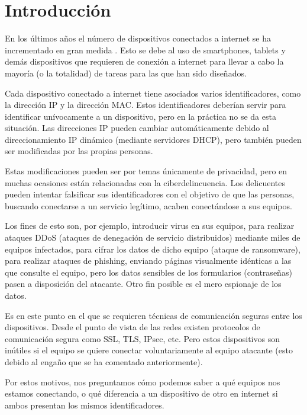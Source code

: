 
\chapter{Introducción}

En los últimos años el número de dispositivos conectados a internet se ha incrementado en gran medida \cite{84Billio53:online}. Esto se debe al uso de smartphones, tablets y demás dispositivos que requieren de conexión a internet para llevar a cabo la mayoría (o la totalidad) de tareas para las que han sido diseñados.

Cada dispositivo conectado a internet tiene asociados varios identificadores, como la dirección IP y la dirección MAC. Estos identificadores deberían servir para identificar unívocamente a un dispositivo, pero en la práctica no se da esta situación. Las direcciones IP pueden cambiar automáticamente debido al direccionamiento IP dinámico (mediante servidores DHCP), pero también pueden ser modificadas por las propias personas. 

Estas modificaciones pueden ser por temas únicamente de privacidad, pero en muchas ocasiones están relacionadas con la ciberdelincuencia. Los delicuentes pueden intentar falsificar sus identificadores con el objetivo de que las personas, buscando conectarse a un servicio legítimo, acaben conectándose a sus equipos.

Los fines de esto son, por ejemplo, introducir virus en sus equipos, para realizar ataques DDoS (ataques de denegación de servicio distribuidos) mediante miles de equipos infectados, para cifrar los datos de dicho equipo (ataque de ransomware), para realizar ataques de phishing, enviando páginas visualmente idénticas a las que consulte el equipo, pero los datos sensibles de los formularios (contraseñas) pasen a disposición del atacante. Otro fin posible es el mero espionaje de los datos.

Es en este punto en el que se requieren técnicas de comunicación seguras entre los dispositivos. Desde el punto de vista de las redes existen protocolos de comunicación segura como SSL, TLS, IPsec, etc. Pero estos dispositivos son inútiles si el equipo se quiere conectar voluntariamente al equipo atacante (esto debido al engaño que se ha comentado anteriormente).

Por estos motivos, nos preguntamos cómo podemos saber a qué equipos nos estamos conectando, o qué diferencia a un dispositivo de otro en internet si ambos presentan los mismos identificadores.

